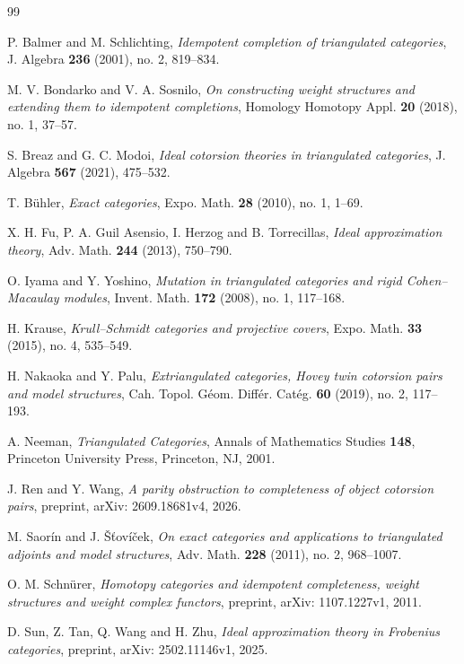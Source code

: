 \documentclass[11pt,a4paper,reqno]{amsart}
\theoremstyle{plain}
\theoremstyle{definition}
\theoremstyle{remark}
\begin{document}
\begin{thebibliography}{99}

P. Balmer and M. Schlichting,
\emph{Idempotent completion of triangulated categories},
J. Algebra \textbf{236} (2001), no. 2, 819--834.

M. V. Bondarko and V. A. Sosnilo,
\emph{On constructing weight structures and extending them to idempotent completions},
Homology Homotopy Appl. \textbf{20} (2018), no. 1, 37--57.

S. Breaz and G. C. Modoi,
\emph{Ideal cotorsion theories in triangulated categories},
J. Algebra \textbf{567} (2021), 475--532.

T. B\"uhler,
\emph{Exact categories},
Expo. Math. \textbf{28} (2010), no. 1, 1--69.

X. H. Fu, P. A. Guil Asensio, I. Herzog and B. Torrecillas,
\emph{Ideal approximation theory},
Adv. Math. \textbf{244} (2013), 750--790.

O. Iyama and Y. Yoshino,
\emph{Mutation in triangulated categories and rigid Cohen--Macaulay modules},
Invent. Math. \textbf{172} (2008), no. 1, 117--168.

H. Krause,
\emph{Krull--Schmidt categories and projective covers},
Expo. Math. \textbf{33} (2015), no. 4, 535--549.

H. Nakaoka and Y. Palu,
\emph{Extriangulated categories, Hovey twin cotorsion pairs and model structures},
Cah. Topol. G\'eom. Diff\'er. Cat\'eg. \textbf{60} (2019), no. 2, 117--193.

A. Neeman,
\emph{Triangulated Categories},
Annals of Mathematics Studies \textbf{148}, Princeton University Press, Princeton, NJ, 2001.

J. Ren and Y. Wang,
\emph{A parity obstruction to completeness of object cotorsion pairs},
preprint, arXiv: 2609.18681v4, 2026.

M. Saor\'in and J. \v{S}\v{t}ov\'i\v{c}ek,
\emph{On exact categories and applications to triangulated adjoints and model structures},
Adv. Math. \textbf{228} (2011), no. 2, 968--1007.

O. M. Schn\"urer,
\emph{Homotopy categories and idempotent completeness, weight structures and weight complex functors},
preprint, arXiv: 1107.1227v1, 2011.

D. Sun, Z. Tan, Q. Wang and H. Zhu,
\emph{Ideal approximation theory in Frobenius categories},
preprint, arXiv: 2502.11146v1, 2025.


\end{thebibliography}
\end{document}
